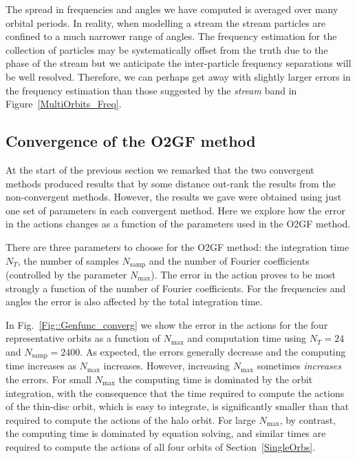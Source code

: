 \documentclass[useAMS,usenatbib,fleqn,a4paper]{mn2e}
\begin{document}
The spread in frequencies and angles we have computed is averaged over many orbital periods. In reality, when modelling a stream the stream particles are confined to a much narrower range of angles. The frequency estimation for the collection of particles may be systematically offset from the truth due to the phase of the stream but we anticipate the inter-particle frequency separations will be well resolved. Therefore, we can perhaps get away with slightly larger errors in the frequency estimation than those suggested by the \emph{stream} band in Figure~\ref{MultiOrbits_Freq}.

\subsection{Convergence of the O2GF method}

At the start of the previous section we remarked that the two convergent
methods produced results that by some distance out-rank the results from the
non-convergent methods. However, the results we gave were obtained using just
one set of parameters in each convergent method.  Here we explore how the
error in the actions changes as a function of the parameters used in the O2GF
method.

There are three parameters to choose for the O2GF method: the
integration time $N_T$, the number of samples $N_\mathrm{samp}$ and the
number of Fourier coefficients (controlled by the parameter
$N_\mathrm{max}$). The error in the action proves to be
most strongly a function of the number of Fourier coefficients. For the
frequencies and angles the error is also affected by the total integration
time.

In Fig.~\ref{Fig::Genfunc_converg} we show the error in the actions for the
four representative orbits as a function of $N_\mathrm{max}$ and computation
time using $N_T=24$ and $N_\mathrm{samp}=2400$. As expected, the errors
generally decrease and the computing time increases as $N_\mathrm{max}$
increases. However, increasing $N_\mathrm{max}$  sometimes {\it increases}
the errors.  For small $N_\mathrm{max}$ the computing time is dominated by
the orbit integration, with the consequence that the time required to compute the
actions of the thin-disc orbit, which is
easy to integrate, is significantly smaller than that required to compute the
actions of the halo orbit. For large $N_\mathrm{max}$, by contrast, the
computing time is dominated by equation solving, and similar times are
required to compute the actions of all four orbits of
Section~\ref{SingleOrbs}.
\end{document}
